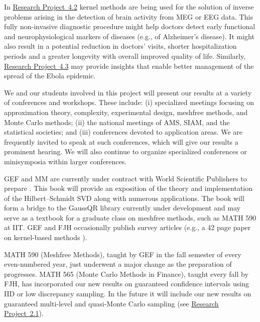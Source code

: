 \documentclass[11pt]{NSFamsart}
\newcommand{\refprobba}{\hyperref[Integrationsubsec]{Research Project~2.1}\xspace}
\newcommand{\refprobdb}{\hyperref[SectMEEG]{Research Project~4.2}\xspace}
\newcommand{\refprobdc}{\hyperref[ebolasubsec]{Research Project~4.3}\xspace}
\begin{document}
\begin{description}[leftmargin=0ex]
\item[Promoting the Well-being of the Broader Society]
In \refprobdb kernel methods are being used for the solution of inverse problems arising in the detection of brain activity from MEG or EEG data. This fully non-invasive diagnostic procedure might help doctors detect early functional and neurophysiological markers of diseases (e.g., of Alzheimer's disease). It might also result in a potential reduction in doctors' visits, shorter hospitalization periods and a greater longevity with overall improved quality of life. Similarly, \refprobdc may provide insights that enable better management of the spread of the Ebola epidemic.

\item[Organizing and Presenting at Conferences]
We and our students involved in this project will present our results at a variety of conferences and workshops.  These include: (i) specialized meetings focusing on approximation theory, complexity, experimental design, meshfree methods, and Monte Carlo methods; (ii) the national meetings of AMS, SIAM, and the statistical societies; and (iii) conferences devoted to application areas.  We are frequently invited to speak at such conferences, which will give our results a prominent hearing. We will also continue to organize specialized conferences or minisymposia within larger conferences.

\item[Writing Textbooks and Survey Papers]
GEF and MM are currently under contract with \linebreak[4] World Scientific Publishers to prepare \citep{FMcC15}. This book will provide an exposition of the theory and implementation of the Hilbert--Schmidt SVD along with numerous applications. The book will form a bridge to the GaussQR library \citep{McCFBG13} currently under development and may serve as a textbook for a graduate class on meshfree methods, such as MATH 590 at IIT. GEF and FJH occasionally publish survey articles (e.g., a 42 page paper on kernel-based methods \citep{Fasshauer11}).

\item[Refreshing Course Syllabi]
MATH 590 (Meshfree Methods), taught by GEF in the fall semester of every even-numbered year, just underwent a major change as the preparation of \citep{FMcC15} progresses.
MATH 565 (Monte Carlo Methods in Finance), taught every fall by FJH, has incorporated our new results on guaranteed confidence intervals using IID or low discrepancy sampling. In the future it will include our new results on guaranteed multi-level and quasi-Monte Carlo sampling (see \refprobba).


\end{description}
\end{document}
